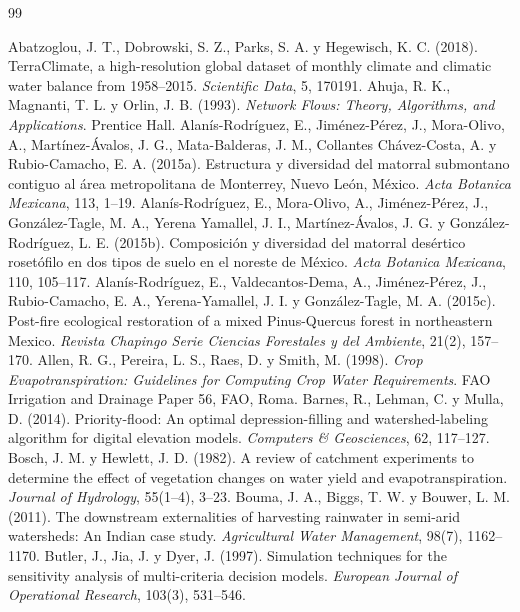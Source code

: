 \documentclass[11pt,letterpaper]{article}
\begin{document}
\begin{thebibliography}{99}
 Abatzoglou, J. T., Dobrowski, S. Z., Parks, S. A. y Hegewisch, K. C. (2018). TerraClimate, a high-resolution global dataset of monthly climate and climatic water balance from 1958–2015. \emph{Scientific Data}, 5, 170191.
 Ahuja, R. K., Magnanti, T. L. y Orlin, J. B. (1993). \emph{Network Flows: Theory, Algorithms, and Applications}. Prentice Hall.
 Alanís-Rodríguez, E., Jiménez-Pérez, J., Mora-Olivo, A., Martínez-Ávalos, J. G., Mata-Balderas, J. M., Collantes Chávez-Costa, A. y Rubio-Camacho, E. A. (2015a). Estructura y diversidad del matorral submontano contiguo al área metropolitana de Monterrey, Nuevo León, México. \emph{Acta Botanica Mexicana}, 113, 1–19.
 Alanís-Rodríguez, E., Mora-Olivo, A., Jiménez-Pérez, J., González-Tagle, M. A., Yerena Yamallel, J. I., Martínez-Ávalos, J. G. y González-Rodríguez, L. E. (2015b). Composición y diversidad del matorral desértico rosetófilo en dos tipos de suelo en el noreste de México. \emph{Acta Botanica Mexicana}, 110, 105–117.
 Alanís-Rodríguez, E., Valdecantos-Dema, A., Jiménez-Pérez, J., Rubio-Camacho, E. A., Yerena-Yamallel, J. I. y González-Tagle, M. A. (2015c). Post-fire ecological restoration of a mixed Pinus-Quercus forest in northeastern Mexico. \emph{Revista Chapingo Serie Ciencias Forestales y del Ambiente}, 21(2), 157–170.
 Allen, R. G., Pereira, L. S., Raes, D. y Smith, M. (1998). \emph{Crop Evapotranspiration: Guidelines for Computing Crop Water Requirements}. FAO Irrigation and Drainage Paper 56, FAO, Roma.
 Barnes, R., Lehman, C. y Mulla, D. (2014). Priority-flood: An optimal depression-filling and watershed-labeling algorithm for digital elevation models. \emph{Computers \& Geosciences}, 62, 117–127.
 Bosch, J. M. y Hewlett, J. D. (1982). A review of catchment experiments to determine the effect of vegetation changes on water yield and evapotranspiration. \emph{Journal of Hydrology}, 55(1–4), 3–23.
 Bouma, J. A., Biggs, T. W. y Bouwer, L. M. (2011). The downstream externalities of harvesting rainwater in semi-arid watersheds: An Indian case study. \emph{Agricultural Water Management}, 98(7), 1162–1170.
 Butler, J., Jia, J. y Dyer, J. (1997). Simulation techniques for the sensitivity analysis of multi-criteria decision models. \emph{European Journal of Operational Research}, 103(3), 531–546.

\end{thebibliography}
\end{document}
